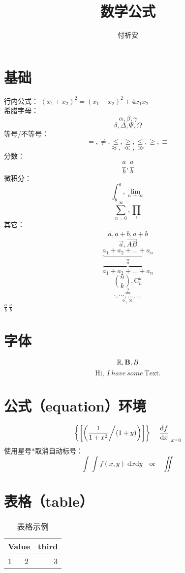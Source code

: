 \documentclass[12pt]{article}
\author{付祈安}
\title{数学公式}
\begin{document}
\maketitle
\tableofcontents
\listoftables

\section{基础}
行内公式：
$ (x_1 + x_2)^2 = (x_1 - x_2)^2 + 4 x_1 x_2 $ \\
希腊字母：
\[ \alpha, \beta, \gamma \]
\[ \delta, \Delta, \Psi, \Omega \]
等号/不等号：
\[ =, \neq, \leq, \geq, \leqslant, \geqslant, \equiv \]
\[ \approx, \ll, \gg \]
分数：
\[ \frac{a}{b}, \frac ab \]
微积分：
\[ \int^a_b, \lim_{n \rightarrow \infty} \]
\[ \sum_{n=0}^{\infty}, \prod_\epsilon \]
其它：
\[ \bar{a}, \overline{a+b}, \underline{a+b} \]
\[ \vec{a}, \overrightarrow{AB} \]
\[ \underbrace{a_1+a_2+\ldots+a_n}_n \]
\[ \overbrace{a_1+a_2+\ldots+a_n}^n \]
\[ \binom{n}{k}, \mathrm{C}_n^k \]
\[ \stackrel{?}{=} \]
\[ \cdot, \cdots, \dots, \ldots \]
\[ \circ, \times \]
$ \frac ab\ {\displaystyle \frac ab} $
\section{字体}
\[ \mathbb{R}, \mathbf{B}, \boldmath{B} \]
\[ \mathrm{Hi},\ I\ have\ some\ \text{Text}. \]
\section{公式（equation）环境}
\begin{equation}
	\label{eq1}
	\left\{ \left[ \left( \frac{1}{1+x^2} \middle/ (1 + y) \right) \right] \right\}
	\quad \left. \frac{\mathrm{d}f}{\mathrm{d}x} \right|_{x = 0}
\end{equation}
使用星号*取消自动标号：
\begin{equation*}
	\int\!\!\!\int f(x, y) \; \mathrm{d} x \mathrm{d} y
	\quad \text{or} \quad \iint
\end{equation*}
\section{表格（table）}
\begin{table}[htbp]
	\begin{center}
		\begin{tabular}{|l|c|r|}
			\hline
			\multicolumn{2}{|c|}{Value} & third     \\ \hline
			1                           & 2     & 3 \\ \cline{1-1}
		\end{tabular}
		\caption{表格示例}
		\label{tab1}
	\end{center}
\end{table}
\end{document}
